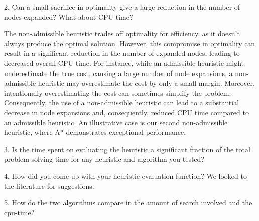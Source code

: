 \documentclass{article}
\begin{document}
2. Can a small sacrifice in optimality give a large reduction in the number of nodes expanded? What about CPU time?

The non-admissible heuristic trades off optimality for efficiency, as it doesn't always produce the optimal solution. However, this compromise in optimality can result in a significant reduction in the number of expanded nodes, leading to decreased overall CPU time. For instance, while an admissible heuristic might underestimate the true cost, causing a large number of node expansions, a non-admissible heuristic may overestimate the cost by only a small margin. Moreover, intentionally overestimating the cost can sometimes simplify the problem. Consequently, the use of a non-admissible heuristic can lead to a substantial decrease in node expansions and, consequently, reduced CPU time compared to an admissible heuristic. An illustrative case is our second non-admissible heuristic, where A* demonstrates exceptional performance.


3. Is the time spent on evaluating the heuristic a significant fraction of the total problem-solving time for any heuristic and algorithm you tested?

4. How did you come up with your heuristic evaluation function?
We looked to the literature for suggestions. 

5. How do the two algorithms compare in the amount of search involved and the cpu-time?
\end{document}
